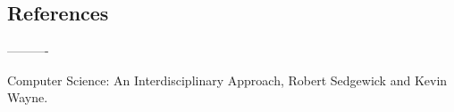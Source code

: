 















		



\subsection{References}
----------

Computer Science: An Interdisciplinary Approach, Robert Sedgewick and Kevin Wayne.
